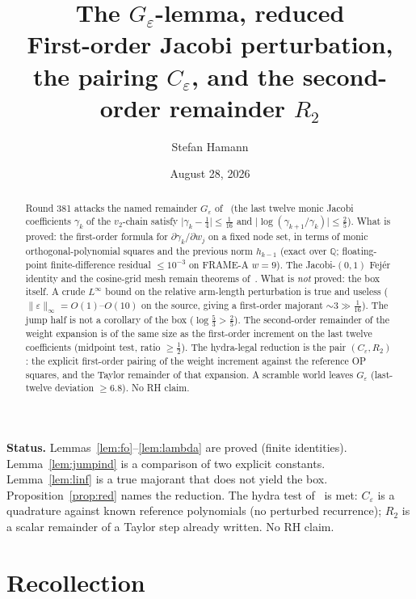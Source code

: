 \documentclass[11pt]{article}
\title{\bfseries The $G_\varepsilon$-lemma, reduced\\[2mm]
\large First-order Jacobi perturbation, the pairing $C_\varepsilon$,
and the second-order remainder $R_2$}
\author{Stefan Hamann}
\date{August 28, 2026}
\theoremstyle{remark}
\newcommand{\Q}{\mathbb{Q}}
\begin{document}
\maketitle

\begin{abstract}\noindent
Round 381 attacks the named remainder $G_\varepsilon$ of~\cite{v3p}
(the last twelve monic Jacobi coefficients $\gamma_k$ of the $v_2$-chain
satisfy $\lvert\gamma_k-\tfrac14\rvert\le\tfrac1{16}$ and
$\lvert\log(\gamma_{k+1}/\gamma_k)\rvert\le\tfrac25$).
What is proved: the first-order formula for $\partial\gamma_k/\partial w_j$
on a fixed node set, in terms of monic orthogonal-polynomial squares
and the previous norm $h_{k-1}$ (exact over $\Q$; floating-point
finite-difference residual $\le 10^{-3}$ on FRAME-A $w=9$).
The Jacobi-$(0,1)$ Fej\'er identity and the cosine-grid mesh remain
theorems of~\cite{v3p}.
What is \emph{not} proved: the box itself.
A crude $L^\infty$ bound on the relative arm-length perturbation
is true and useless ($\lVert\varepsilon\rVert_\infty=O(1)$--$O(10)$
on the source, giving a first-order majorant $\sim 3\gg\tfrac1{16}$).
The jump half is not a corollary of the box
($\log\tfrac53>\tfrac25$).
The second-order remainder of the weight expansion is of the
same size as the first-order increment on the last twelve
coefficients (midpoint test, ratio $\ge\tfrac12$).
The hydra-legal reduction is the pair $(C_\varepsilon,R_2)$:
the explicit first-order pairing of the weight increment against
the reference OP squares, and the Taylor remainder of that expansion.
A scramble world leaves $G_\varepsilon$ (last-twelve deviation
$\ge 6.8$).  No RH claim.
\end{abstract}

\medskip\noindent
\textbf{Status.}\enspace
Lemmas~\ref{lem:fo}--\ref{lem:lambda} are proved (finite identities).
Lemma~\ref{lem:jumpind} is a comparison of two explicit constants.
Lemma~\ref{lem:linf} is a true majorant that does not yield the box.
Proposition~\ref{prop:red} names the reduction.
The hydra test of~\cite{v2} is met: $C_\varepsilon$ is a quadrature
against known reference polynomials (no perturbed recurrence);
$R_2$ is a scalar remainder of a Taylor step already written.
No RH claim.

\section{Recollection}\label{sec:rec}
\end{document}
